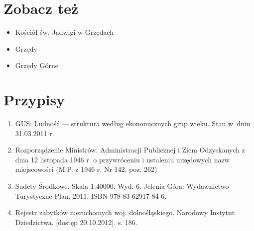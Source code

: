 \documentclass[a4paper,12pt]{article}
\begin{document}
\section{Zobacz też}
\begin{itemize}
\item Kościół św. Jadwigi w Grzędach
\item Grzędy
\item Grzędy Górne
\end{itemize}
\section{Przypisy}
\begin{enumerate}
\item GUS: Ludność --- struktura według ekonomicznych grup wieku. Stan w~dniu 31.03.2011 r.
\item  Rozporządzenie Ministrów: Administracji Publicznej i Ziem Odzyskanych z dnia 12 listopada 1946 r. o przywróceniu i ustaleniu urzędowych nazw miejscowości (M.P. z 1946 r. Nr 142, poz. 262)
\item Sudety Środkowe. Skala 1:40000. Wyd. 6. Jelenia Góra: Wydawnictwo Turystyczne Plan, 2011. ISBN 978-83-62917-84-6.
\item Rejestr zabytków nieruchomych woj. dolnośląskiego. Narodowy Instytut Dziedzictwa. [dostęp 20.10.2012]. s. 186.
\end{enumerate}
\end{document}
